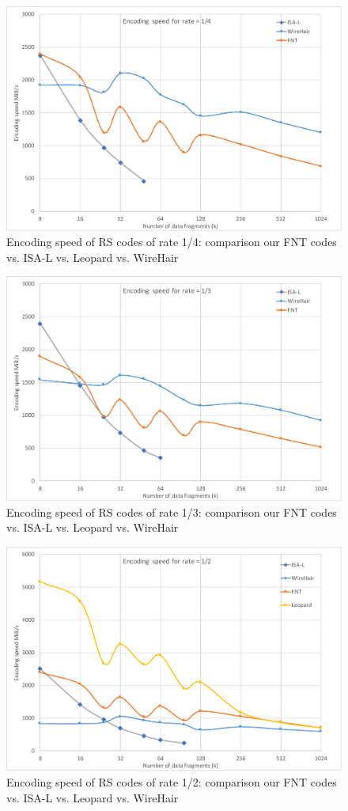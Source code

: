 \documentclass[oneside,9pt]{article}
\begin{document}
\begin{figure}[!ht]
\centering
\includegraphics[width=0.7\columnwidth]{Enc_Rate1-4.pdf}
\caption{Encoding speed of RS codes of rate 1/4: comparison our FNT codes vs. ISA-L vs. Leopard vs. WireHair}
\label{fig:comp_enc_rate_1_4}
\end{figure}

\begin{figure}[!ht]
\centering
\includegraphics[width=0.7\columnwidth]{Enc_Rate1-3.pdf}
\caption{Encoding speed of RS codes of rate 1/3: comparison our FNT codes vs. ISA-L vs. Leopard vs. WireHair}
\label{fig:comp_enc_rate_1_3}
\end{figure}

\begin{figure}[!ht]
\centering
\includegraphics[width=0.7\columnwidth]{Enc_Rate1-2.pdf}
\caption{Encoding speed of RS codes of rate 1/2: comparison our FNT codes vs. ISA-L vs. Leopard vs. WireHair}
\label{fig:comp_enc_rate_1_2}
\end{figure}
\end{document}
